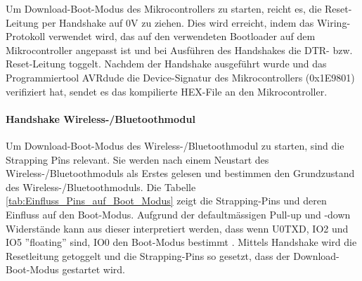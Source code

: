 Um Download-Boot-Modus des Mikrocontrollers zu starten, reicht es, die Reset-Leitung per Handshake auf 0V zu ziehen. Dies wird erreicht, indem das Wiring-Protokoll verwendet wird, das auf den verwendeten Bootloader auf dem Mikrocontroller angepasst ist und bei Ausführen des Handshakes die DTR- bzw. Reset-Leitung toggelt. Nachdem der Handshake ausgeführt wurde und das Programmiertool AVRdude die Device-Signatur des Mikrocontrollers (0x1E9801) verifiziert hat, sendet es das kompilierte HEX-File an den Mikrocontroller.


\paragraph{Handshake Wireless-/Bluetoothmodul}\mbox{}

Um Download-Boot-Modus des Wireless-/Bluetoothmodul zu starten, sind die Strapping Pîns relevant. Sie werden nach einem Neustart des Wireless-/Bluetoothmoduls als Erstes gelesen und bestimmen den Grundzustand des Wireless-/Bluetoothmoduls. Die Tabelle \ref{tab:Einfluss_Pins_auf_Boot_Modus} zeigt die Strapping-Pins und deren Einfluss auf den Boot-Modus. Aufgrund der defaultmässigen Pull-up und -down Widerstände kann aus dieser interpretiert werden, dass wenn U0TXD, IO2 und IO5 ''floating'' sind, IO0 den Boot-Modus bestimmt \cite[S.12-S.14]{espressif_systems_esp32_2016}. Mittels Handshake wird die Resetleitung getoggelt und die Strapping-Pins so gesetzt, dass der Download-Boot-Modus gestartet wird.


